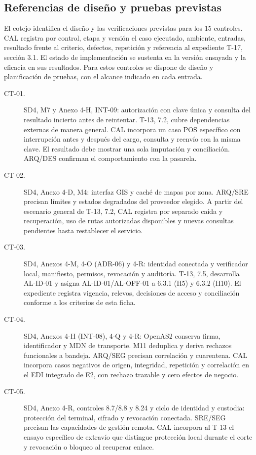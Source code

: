 \subsection*{Referencias de diseño y pruebas previstas}

El cotejo identifica el diseño y las verificaciones previstas para los 15 controles. CAL registra por control, etapa y versión el caso ejecutado, ambiente, entradas, resultado frente al criterio, defectos, repetición y referencia al expediente T-17, sección 3.1. El estado de implementación se sustenta en la versión ensayada y la eficacia en sus resultados. Para estos controles se dispone de diseño y planificación de pruebas, con el alcance indicado en cada entrada.

\begin{description}
\item[CT-01.] SD4, M7 y Anexo 4-H, INT-09: autorización con clave única y consulta del resultado incierto antes de reintentar. T-13, 7.2, cubre dependencias externas de manera general. CAL incorpora un caso POS específico con interrupción antes y después del cargo, consulta y reenvío con la misma clave. El resultado debe mostrar una sola imputación y conciliación. ARQ/DES confirman el comportamiento con la pasarela.
\item[CT-02.] SD4, Anexo 4-D, M4: interfaz GIS y caché de mapas por zona. ARQ/SRE precisan límites y estados degradados del proveedor elegido. A partir del escenario general de T-13, 7.2, CAL registra por separado caída y recuperación, uso de rutas autorizadas disponibles y nuevas consultas pendientes hasta restablecer el servicio.
\item[CT-03.] SD4, Anexos 4-M, 4-O (ADR-06) y 4-R: identidad conectada y verificador local, manifiesto, permisos, revocación y auditoría. T-13, 7.5, desarrolla AL-ID-01 y asigna AL-ID-01/AL-OFF-01 a 6.3.1 (H5) y 6.3.2 (H10). El expediente registra vigencia, relevos, decisiones de acceso y conciliación conforme a los criterios de esta ficha.
\item[CT-04.] SD4, Anexos 4-H (INT-08), 4-Q y 4-R: OpenAS2 conserva firma, identificador y MDN de transporte. M11 deduplica y deriva rechazos funcionales a bandeja. ARQ/SEG precisan correlación y cuarentena. CAL incorpora casos negativos de origen, integridad, repetición y correlación en el EDI integrado de E2, con rechazo trazable y cero efectos de negocio.
\item[CT-05.] SD4, Anexo 4-R, controles 8.7/8.8 y 8.24 y ciclo de identidad y custodia: protección del terminal, cifrado y revocación conectada. SRE/SEG precisan las capacidades de gestión remota. CAL incorpora al T-13 el ensayo específico de extravío que distingue protección local durante el corte y revocación o bloqueo al recuperar enlace.

\end{description}
